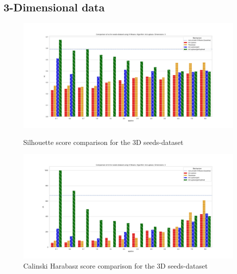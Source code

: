 \subsection{3-Dimensional data}
\begin{figure}[H]
    \centering
    \begin{minipage}[c]{0.8\textwidth}
        \includegraphics[width=1\textwidth]{Results/RQ2/seeds-dataset/sc_seeds-dataset_comparison.png}
        \caption{Silhouette score comparison for the 3D seeds-dataset}
        \label{fig:appendix-sc_seeds-dataset_comparison_3d}
    \end{minipage}
    \begin{minipage}[c]{0.8\textwidth}
        \includegraphics[width=1\textwidth]{Results/RQ2/seeds-dataset/ch_seeds-dataset_comparison.png}
        \caption{Calinski Harabasz score comparison for the 3D seeds-dataset}
        \label{fig:appendix-ch_seeds-dataset_comparison_3d}
    \end{minipage}

\end{figure}
